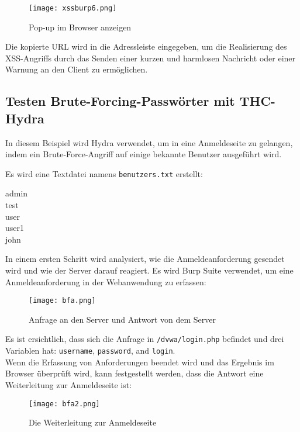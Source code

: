 \newpage

\begin{figure}[h]
	\centering
	\texttt{[image: xssburp6.png]}
	\caption{Pop-up im Browser anzeigen}
\end{figure}

Die kopierte URL wird in die Adressleiste eingegeben, um die Realisierung des
XSS-Angriffs durch das Senden einer kurzen und harmlosen Nachricht oder einer
Warnung an den Client zu ermöglichen.


\subsection{Testen Brute-Forcing-Passwörter mit THC-Hydra}

In diesem Beispiel wird Hydra verwendet, um in eine Anmeldeseite zu gelangen, indem ein Brute-Force-Angriff auf einige bekannte Benutzer ausgeführt wird\cite[143]{najera2016kali}.

Es wird eine Textdatei namens \texttt{benutzers.txt} erstellt{\cite[144]{najera2016kali}}:

\begin{center}
	admin\\test\\user\\user1\\john
\end{center}

In einem ersten Schritt wird analysiert, wie die Anmeldeanforderung gesendet wird und wie der Server darauf reagiert. Es wird Burp Suite verwendet, um eine Anmeldeanforderung in der Webanwendung zu erfassen\cite[144]{najera2016kali}:

\newpage

\begin{figure}[h]
	\centering
	\texttt{[image: bfa.png]}
	\caption{Anfrage an den Server und Antwort von dem Server}
\end{figure}

Es ist ersichtlich, dass sich die Anfrage in \texttt{/dvwa/login.php} befindet und drei Variablen hat: \texttt{username}, \texttt{password}, and \texttt{login}.\\

Wenn die Erfassung von Anforderungen beendet wird und das Ergebnis im Browser überprüft wird, kann festgestellt werden, dass die Antwort eine Weiterleitung zur Anmeldeseite  ist\cite[144]{najera2016kali}:

\begin{figure}[h]
	\centering
	\texttt{[image: bfa2.png]}
	\caption{Die Weiterleitung zur Anmeldeseite}
\end{figure}

